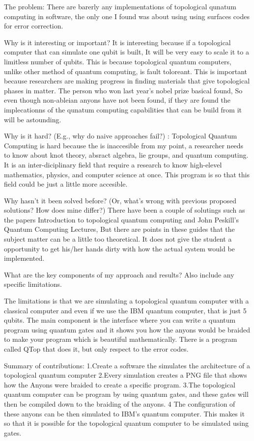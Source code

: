 \documentclass{article}
\begin{document}
The problem: There are barerly any implementations of topological qunatum computing in software, the only one I found was about using using surfaces codes for error correction.

Why is it interesting or important? It is interesting because if a topological computer that can simulate one qubit is built, It will be very easy to scale it to a limitless number of qubits. This is because topological quantum computers, unlike other method of quantum computing, is fault toloreant. This is important because researchers are making progress in finding materials that give topological phases in matter. The person who won last year's nobel prize basical found, So even though non-ableian anyons have not been found, if they are found the implecationns of the qunatum computing capabilities that can be build from it will be astounding.

Why is it hard? (E.g., why do naive approaches fail?) : Topological Quantum Computing is hard because the  is inaccesible from my point, a researcher needs to know about knot theory, absract algebra, lie groups, and quantum computing. It is an inter-diciplinary field that require a research to know high-elevel mathematics, physics, and computer science at once. This program is so that this field could be just a little more accesible.

Why hasn't it been solved before? (Or, what's wrong with previous proposed solutions? How does mine differ?)
There have been a couple of solutings such as the papers Introduction to topological quantum computing and John Peskill's Quantum Computing Lectures, But there are points in these guides that the subject matter can be a little too theoretical. It does not give the student a opportunity to get his/her hands dirty with how the actual system would be implemented.

What are the key components of my approach and results? Also include any specific limitations.

The limitations is that we are simulating a topological quantum computer with a classical computer and even if we use the IBM quantum computer, that is just 5 qubits. The main component is the interface where you can write a quantum program using quantum gates and it shows you how the anyons would be braided to make your program which is beautiful mathematically. There is a program called QTop that does it, but only respect to the error codes.

Summary of contributions:
1.Create a software the simulates the architecture of a topological quantum computer
2.Every simulation creates a PNG file that shows how the Anyons were braided to create a specific program.
3.The topological quantum computer can be program by using quantum gates, and these gates will then be compiled down to the braiding of the anyons.
4 The configuration of these anyons can be then simulated to IBM's quantum computer. This makes it so that it is possible for the topological quantum computer to be simulated using gates.
\end{document}
